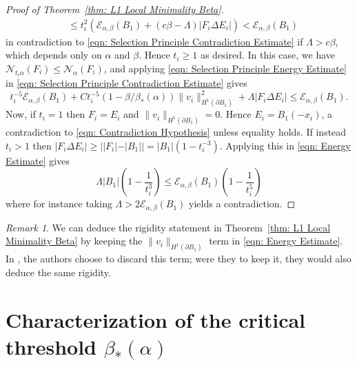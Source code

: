 \documentclass[a4paper,11pt,reqno]{amsart}
\numberwithin{equation}{section}
\theoremstyle{remark}
\newtheorem{remark}[theorem]{Remark}
\theoremstyle{definition}
\newcommand{\ene}{\mathcal{E}_{\alpha,\beta}}
\renewcommand{\leq}{\leqslant}
\renewcommand{\geq}{\geqslant}
\newcommand{\calN}{\mathcal{N}}
\begin{document}
\begin{proof}[Proof of Theorem~\ref{thm: L1 Local Minimality Beta}]
\begin{align*}
		&\leq  t_i^2\left(\ene(B_1) +(c\beta-\Lambda )|F_i\Delta E_i|\right) < \ene(B_1)
	\end{align*}
in contradiction to \eqref{eqn: Selection Principle Contradiction Estimate} if $\Lambda>c\beta$, which depends only on $\alpha$ and $\beta$. Hence $t_i \geq 1$ as desired. In this case, we have $\calN_{t_i\alpha}(F_i) \leq \calN_{\alpha}(F_i)$, and applying \eqref{eqn: Selection Principle Energy Estimate} in \eqref{eqn: Selection Principle Contradiction Estimate} gives
	\begin{equation}\label{eqn: Energy Estimate}
		t_i^{-5}\ene(B_1)+Ct_i^{-5}(1-\beta/\beta_*(\alpha))\|v_i\|_{H^1(\partial B_1)}^2 +\Lambda|F_i\Delta E_i|\leq \ene(B_1).
	\end{equation}
Now, if $t_i=1$ then $F_i=E_i$ and $\|v_i\|_{H^1(\partial B_1)}=0$. Hence $E_i=B_1(-x_i)$, a contradiction to \eqref{eqn: Contradiction Hypothesis} unless equality holds. If instead $t_i>1$ then $|F_i\Delta E_i|\geq ||F_i|-|B_1||=|B_1|(1-t_i^{-3})$. Applying this in \eqref{eqn: Energy Estimate} gives
	\[
	\Lambda |B_1|\left(1-\frac{1}{t_i^3}\right)	\leq \ene(B_1)\left(1-\frac{1}{t_i^5}\right)
	\]
where for instance taking $\Lambda>2\ene(B_1)$ yields a contradiction.
\end{proof}

\begin{remark}
	We can deduce the rigidity statement in Theorem~\ref{thm: L1 Local Minimality Beta} by keeping the $\|v_i\|_{H^1(\partial B_1)}$ term in \eqref{eqn: Energy Estimate}. In \cite[Lemma 8.5]{FFMMM}, the authors choose to discard this term; were they to keep it, they would also deduce the same rigidity.
\end{remark}


\appendix
\section{Characterization of the critical threshold \texorpdfstring{$\beta_*(\alpha)$}{β\_*(α)}}\label{sec:appendix}
\end{document}
